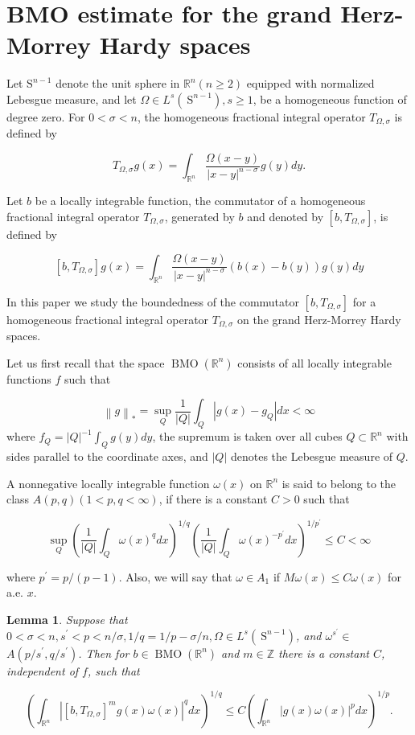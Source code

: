 \documentclass[oneside,reqno]{amsart}
\newtheorem{lem}[theorem]{Lemma}
\numberwithin{equation}{section}
\theoremstyle{definition}
\begin{document}
\section{BMO estimate for the grand Herz-Morrey  Hardy spaces}
Let $\mathrm{S}^{n-1}$ denote the unit sphere in $\mathbb{R}^{n}(n \geq 2)$ equipped with normalized Lebesgue measure, and let $\Omega \in L^{s}\left(\mathrm{~S}^{n-1}\right), s \geq 1$, be a homogeneous function of degree zero. For $0<\sigma<n$, the homogeneous fractional integral operator $T_{\Omega, \sigma}$ is defined by

$$
T_{\Omega, \sigma} g(x)=\int_{\mathbb{R}^{n}} \frac{\Omega(x-y)}{|x-y|^{n-\sigma}} g(y) d y.
$$

Let $b$ be a locally integrable function, the commutator of a homogeneous fractional integral operator $T_{\Omega, \sigma}$, generated by $b$ and denoted by $\left[b, T_{\Omega, \sigma}\right]$, is defined by

$$
\left[b, T_{\Omega, \sigma}\right] g(x)=\int_{\mathbb{R}^{n}} \frac{\Omega(x-y)}{|x-y|^{n-\sigma}}(b(x)-b(y)) g(y) d y
$$

In this paper we study the boundedness of the commutator $\left[b, T_{\Omega, \sigma}\right]$ for a homogeneous fractional integral operator $T_{\Omega, \sigma}$ on the grand Herz-Morrey  Hardy spaces.
 
Let us first recall that the space $\operatorname{BMO}\left(\mathbb{R}^{n}\right)$ consists of all locally integrable functions $f$ such that

$$
\left\| g\right\|_{*}=\sup _{Q} \frac{1}{|Q|} \int_{Q}\left|g(x)-g_{Q}\right| d x<\infty
$$
where $f_{Q}=|Q|^{-1} \int_{Q} g(y) d y$, the supremum is taken over all cubes $Q \subset \mathbb{R}^{n}$ with sides parallel to the coordinate axes, and $|Q|$ denotes the Lebesgue measure of $Q$.

A nonnegative locally integrable function $\omega(x)$ on $\mathbb{R}^{n}$ is said to belong to the class $A(p, q)(1<p, q<\infty)$, if there is a constant $C>0$ such that

$$
\sup _{Q}\left(\frac{1}{|Q|} \int_{Q} \omega(x)^{q} d x\right)^{1 / q}\left(\frac{1}{|Q|} \int_{Q} \omega(x)^{-p^{\prime}} d x\right)^{1 / p^{\prime}} \leq C<\infty
$$

where $p^{\prime}=p /(p-1)$. Also, we will say that $\omega \in A_{1}$ if $M \omega(x) \leq C \omega(x)$ for a.e. $x$.

\begin{lem}\cite{ding}
     Suppose that $0<\sigma<n, s^{\prime}<p<n / \sigma, 1 / q=1 / p-\sigma / n, \Omega \in L^{s}\left(\mathrm{~S}^{n-1}\right)$, and $\omega^{s^{\prime}} \in$ $A\left(p / s^{\prime}, q / s^{\prime}\right)$. Then for $b \in \operatorname{BMO}\left(\mathbb{R}^{n}\right)$ and $m \in \mathbb{Z}$ there is a constant $C$, independent of $f$, such that

$$
\left(\int_{\mathbb{R}^{n}}\left|\left[b, T_{\Omega, \sigma}\right]^{m} g(x) \omega(x)\right|^{q} d x\right)^{1 / q} \leq C\left(\int_{\mathbb{R}^{n}}|g(x) \omega(x)|^{p} d x\right)^{1 / p}.
$$
\end{lem}
\end{document}
